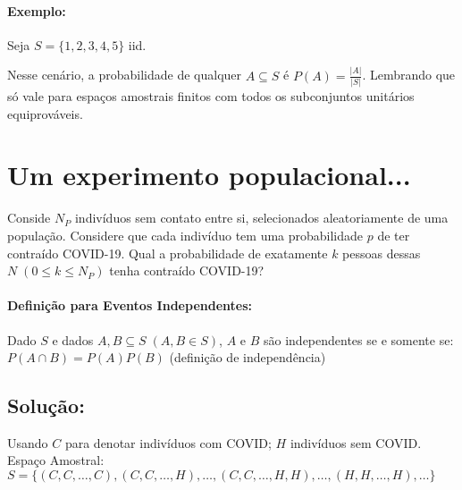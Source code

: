 \documentclass{article}
\begin{document}
\paragraph{Exemplo:}
Seja $S = \{1,2,3,4,5\}$ iid.

Nesse cenário, a probabilidade de qualquer $A \subseteq S$ é $P(A) = \frac{|A|}{|S|}$.
Lembrando que só vale para espaços amostrais finitos com todos os subconjuntos unitários
equiprováveis.

\section{Um experimento populacional...}
Conside $N_P$ indivíduos sem contato entre si, selecionados aleatoriamente de uma população.
Considere que cada indivíduo tem uma probabilidade $p$ de ter contraído COVID-19. Qual a
probabilidade de exatamente $k$ pessoas dessas $N \; (0 \leq k \leq N_P)$ tenha contraído COVID-19?

\paragraph{Definição para Eventos Independentes:}
Dado $S$ e dados $A, B \subseteq S \; (A, B \in S)$, $A$ e $B$ são independentes se e somente se:
$P(A \cap B) = P(A)P(B)$ (definição de independência)

\newpage
\subsection*{Solução:}
Usando $C$ para denotar indivíduos com COVID; $H$ indivíduos sem COVID.
\\[0.25em]
Espaço Amostral: $S = \{(C,C,\ldots,C),(C,C,\ldots,H),\ldots,(C,C,\ldots,H,H),\ldots,(H,H,\ldots,H),\ldots\}$
\end{document}
